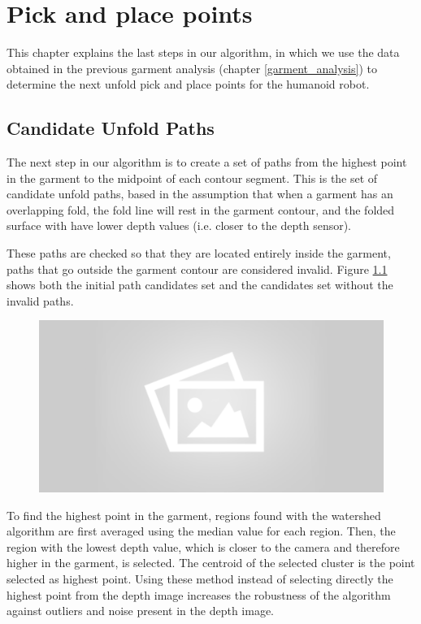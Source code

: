 \chapter{Pick and place points}
\label{pick_and_place}
This chapter explains the last steps in our algorithm, in which we use the data obtained in the previous garment analysis (chapter \ref{garment_analysis}) to determine the next unfold pick and place points for the humanoid robot.

\section{Candidate Unfold Paths}
\label{unfold_paths}

The next step in our algorithm is to create a set of paths from the highest point in the garment to the midpoint of each contour segment. This is the set of candidate unfold paths, based in the assumption that when a garment has an overlapping fold, the fold line will rest in the garment contour, and the folded surface with have lower depth values (i.e. closer to the depth sensor).

These paths are checked so that they are located entirely inside the garment, paths that go outside the garment contour are considered invalid. Figure \ref{fig:candidate_paths} shows both the initial path candidates set and the candidates set without the invalid paths.

\begin{figure}[thpb]
    \centering
    \includegraphics[width=0.7
    \textwidth]{figures/placeholder2.png}
    \caption{}
    \label{fig:candidate_paths}
\end{figure}


To find the highest point in the garment, regions found with the watershed algorithm are first averaged using the median value for each region. Then, the region with the lowest depth value, which is closer to the camera and therefore higher in the garment, is selected. The centroid of the selected cluster is the point selected as highest point. Using these method instead of selecting directly the highest point from the depth image increases the robustness of the algorithm against outliers and noise present in the depth image.


